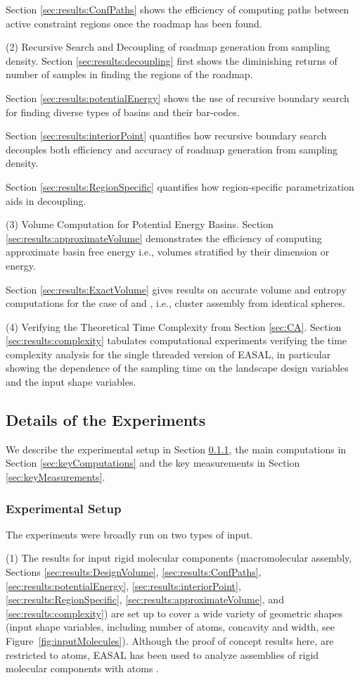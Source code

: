 \documentclass[]{article}
\newcommand{\figref}[1]{Figure~\ref{#1}}
\newcommand{\rmc}{rigid molecular component}
\begin{document}
Section \ref{sec:results:ConfPaths} shows the
efficiency of computing paths between active constraint regions once the roadmap
has been found.

(2) Recursive Search and Decoupling of roadmap generation from sampling
density. Section \ref{sec:results:decoupling} first shows the diminishing
returns of number of samples in finding the regions of the roadmap.

Section
\ref{sec:results:potentialEnergy} shows the use of recursive boundary search
for finding diverse types of basins and their bar-codes.

Section
\ref{sec:results:interiorPoint} quantifies how recursive boundary search
decouples both efficiency and accuracy of roadmap generation from sampling
density.

Section \ref{sec:results:RegionSpecific} quantifies how
region-specific parametrization aids in decoupling.

(3) Volume Computation for Potential Energy Basins. Section
\ref{sec:results:approximateVolume} 
demonstrates the efficiency of computing approximate basin free energy
i.e., volumes stratified by their dimension or energy.

Section
\ref{sec:results:ExactVolume} gives results on accurate volume and entropy
computations for the case of  and , i.e., cluster assembly from
identical spheres.

(4) Verifying the Theoretical Time Complexity from Section \ref{sec:CA}.
Section \ref{sec:results:complexity} tabulates computational experiments
verifying the time complexity analysis for the single threaded version of
EASAL, in particular showing the dependence of the sampling time on the 
landscape design variables and the input shape variables.


\subsection{Details of the Experiments}
We describe the experimental setup in Section \ref{sec:expSetup},
the main computations in Section \ref{sec:keyComputations} and the key measurements
in Section \ref{sec:keyMeasurements}.

\subsubsection{Experimental Setup}
\label{sec:expSetup}
The experiments were broadly run on two types of input.

(1) The results for  input \rmc s (macromolecular assembly,
Sections
\ref{sec:results:DesignVolume}, \ref{sec:results:ConfPaths},
\ref{sec:results:potentialEnergy}, 
\ref{sec:results:interiorPoint}, \ref{sec:results:RegionSpecific},
\ref{sec:results:approximateVolume}, and \ref{sec:results:complexity}) are set
up to cover a wide variety of geometric shapes (input shape variables,
including number of atoms, concavity and width, see
\figref{fig:inputMolecules}).  Although the proof of concept results here, are
restricted to  atoms, EASAL has been used to analyze assemblies of \rmc s
with  atoms \cite{Wu2012}.
\end{document}
